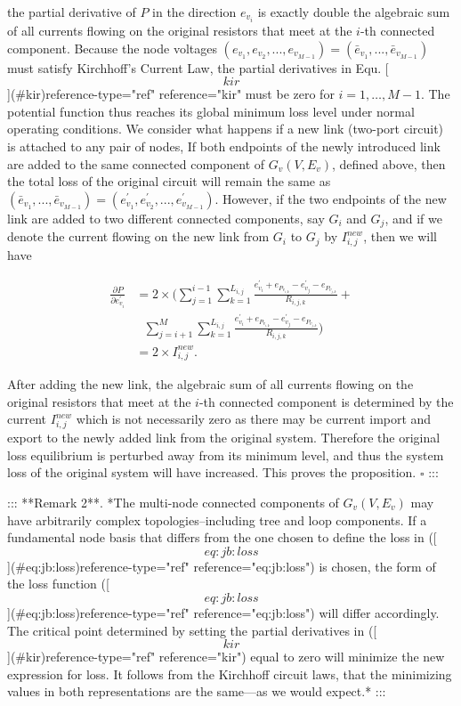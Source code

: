 the partial derivative of $P$ in the direction $e_{v_i}$ is exactly double the algebraic sum of all currents flowing on the original resistors that meet at the $i$-th connected component. Because the node voltages $(e_{v_1},e_{v_2},...,e_{v_{M-1}})=(\bar{e}_{v_1},...,\bar{e}_{v_{M-1}})$ must satisfy Kirchhoff's Current Law, the partial derivatives in Equ. [\[kir\]](#kir){reference-type="ref" reference="kir"} must be zero for $i=1,\dots,M-1$. The potential function thus reaches its global minimum loss level under normal operating conditions. We consider what happens if a new link (two-port circuit) is attached to any pair of nodes, If both endpoints of the newly introduced link are added to the same connected component of $G_v(V,E_v)$, defined above, then the total loss of the original circuit will remain the same as $(\bar{e}_{v_1},...,\bar{e}_{v_{M-1}})=(e_{v_1}^{'},e_{v_2}^{'},...,e_{v_{M-1}}^{'})$. However, if the two endpoints of the new link are added to two different connected components, say $G_i$ and $G_j$, and if we denote the current flowing on the new link from $G_i$ to $G_j$ by $I_{i,j}^{new}$, then we will have

$$\begin{split} \frac{\partial P}{\partial e_{v_i}^{'}}&=2\times(\sum_{j=1}^{i-1}\sum_{k=1}^{L_{i,j}}\frac{e_{v_i}^{'}+e_{P_{v_{i,k}}}-e_{v_j}^{'}-e_{P_{v_{j,k}}}}{R_{i,j,k}}+ \\ &\ \ \ \sum_{j=i+1}^{M}\sum_{k=1}^{L_{i,j}}\frac{e_{v_i}^{'}+e_{P_{v_{i,k}}}-e_{v_j}^{'}-e_{P_{v_{j,k}}}}{R_{i,j,k}})\\&=2\times I_{i,j}^{new}. \end{split}$$

After adding the new link, the algebraic sum of all currents flowing on the original resistors that meet at the $i$-th connected component is determined by the current $I_{i,j}^{new}$ which is not necessarily zero as there may be current import and export to the newly added link from the original system. Therefore the original loss equilibrium is perturbed away from its minimum level, and thus the system loss of the original system will have increased. This proves the proposition. $\square$ :::

::: **Remark 2**. *The multi-node connected components of $G_v(V,E_v)$ may have arbitrarily complex topologies--including tree and loop components. If a fundamental node basis that differs from the one chosen to define the loss in ([\[eq:jb:loss\]](#eq:jb:loss){reference-type="ref" reference="eq:jb:loss"}) is chosen, the form of the loss function ([\[eq:jb:loss\]](#eq:jb:loss){reference-type="ref" reference="eq:jb:loss"}) will differ accordingly. The critical point determined by setting the partial derivatives in ([\[kir\]](#kir){reference-type="ref" reference="kir"}) equal to zero will minimize the new expression for loss. It follows from the Kirchhoff circuit laws, that the minimizing values in both representations are the same---as we would expect.* :::

